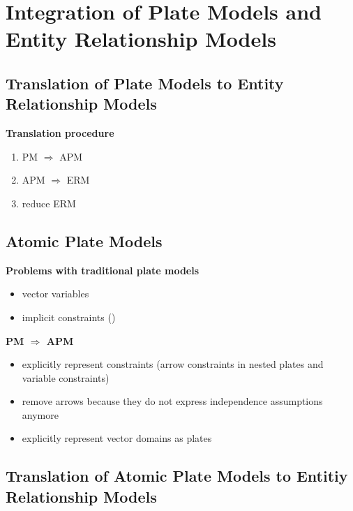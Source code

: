 \section{Integration of Plate Models and Entity Relationship Models}

\subsection{Translation of Plate Models to Entity Relationship Models}

\textbf{Translation procedure}
\begin{enumerate}
\item PM $\Rightarrow$ APM
\item APM $\Rightarrow$ ERM
\item reduce ERM
\end{enumerate}

\subsection{Atomic Plate Models}

\textbf{Problems with traditional plate models}
\begin{itemize}
\item vector variables
\item implicit constraints (\cite{heckerman2007probabilistic})
\end{itemize}

\textbf{PM $\Rightarrow$ APM}
\begin{itemize}
\item explicitly represent constraints (arrow constraints in nested plates and variable constraints)
\item remove arrows because they do not express independence assumptions anymore
\item explicitly represent vector domains as plates
\end{itemize}

\subsection{Translation of Atomic Plate Models to Entitiy Relationship Models}


